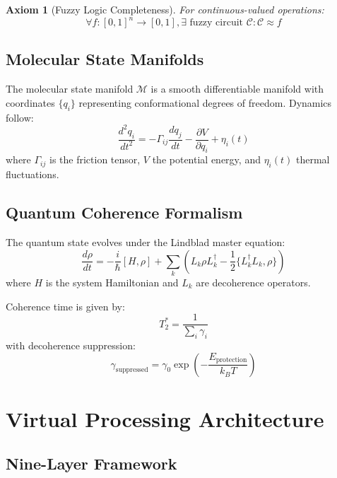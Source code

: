 \documentclass[12pt]{article}
\newtheorem{axiom}[theorem]{Axiom}
\begin{document}
\begin{axiom}[Fuzzy Logic Completeness]
For continuous-valued operations:
\begin{equation}
\forall f: [0,1]^n \rightarrow [0,1], \exists \text{ fuzzy circuit } \mathcal{C}: \mathcal{C} \approx f
\end{equation}
\end{axiom}

\subsection{Molecular State Manifolds}

The molecular state manifold $\mathcal{M}$ is a smooth differentiable manifold with coordinates $\{q_i\}$ representing conformational degrees of freedom. Dynamics follow:
\begin{equation}
\frac{d^2 q_i}{dt^2} = -\Gamma_{ij} \frac{dq_j}{dt} - \frac{\partial V}{\partial q_i} + \eta_i(t)
\end{equation}
where $\Gamma_{ij}$ is the friction tensor, $V$ the potential energy, and $\eta_i(t)$ thermal fluctuations.

\subsection{Quantum Coherence Formalism}

The quantum state evolves under the Lindblad master equation:
\begin{equation}
\frac{d\rho}{dt} = -\frac{i}{\hbar}[H, \rho] + \sum_k \left( L_k \rho L_k^\dagger - \frac{1}{2}\{L_k^\dagger L_k, \rho\} \right)
\end{equation}
where $H$ is the system Hamiltonian and $L_k$ are decoherence operators.

Coherence time is given by:
\begin{equation}
T_2^{*} = \frac{1}{\sum_i \gamma_i}
\end{equation}
with decoherence suppression:
\begin{equation}
\gamma_{\text{suppressed}} = \gamma_0 \exp\left(-\frac{E_{\text{protection}}}{k_B T}\right)
\end{equation}

\section{Virtual Processing Architecture}

\subsection{Nine-Layer Framework}
\end{document}
